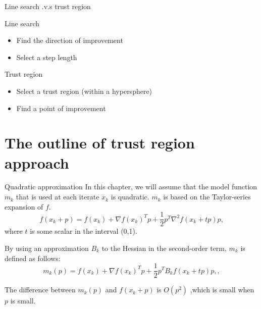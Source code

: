 \documentclass{beamer}
\begin{document}
\begin{frame}{Line search .v.s trust region}
\begin{alertblock}{Line search}
\begin{itemize}
    \item Find the direction of improvement
    \item Select a step length
\end{itemize}
\end{alertblock}
\vfill
\begin{alertblock}{Trust region}
\begin{itemize}
    \item Select a trust region (within a hypersphere)
    \item Find a point of improvement
\end{itemize}
\end{alertblock}

\end{frame}

\section{The outline of trust region approach}
\begin{frame}{Quadratic approximation}
In this chapter, we will assume that the model function $m_k$ that is used at each iterate $x_k$ is quadratic. 
$m_k$ is based on the Taylor-series expansion of $f$.
\begin{equation*}
    f(x_k + p) = f(x_k) + \nabla f(x_k)^T p + \frac{1}{2}p^T \nabla^2 f(x_k + tp)p,
\end{equation*}
where $t$ is some scalar in the interval (0,1). 

By using an approximation $B_k$ to the Hessian in the second-order term, $m_k$ is defined as follows:
\begin{equation*}
    m_k(p) = f(x_k) + \nabla f(x_k)^T p + \frac{1}{2}p^T B_k f(x_k + tp)p,,
\end{equation*}

The difference between $m_k(p)$ and $f(x_k + p)$ is $O(p^2)$ ,which is small when $p$ is small.

\end{frame}
\end{document}
